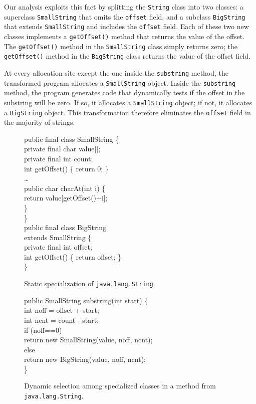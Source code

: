 \documentclass{acmconf}
\begin{document}
Our analysis exploits this fact by splitting the 
{\tt String} class into two classes: a superclass {\tt SmallString}
that omits the {\tt offset} field, and a subclass {\tt BigString} that
extends {\tt SmallString} and includes the {\tt offset} field. 
Each of these two new classes implements a {\tt getOffset()} method
that returns the value of the offset. The {\tt getOffset()} method
in the {\tt SmallString} class simply returns zero; the {\tt
getOffset()} method in the {\tt BigString} class returns the 
value of the offset field. 

At every allocation site except the one inside the {\tt substring}
method, the transformed program allocates a {\tt SmallString} 
object. Inside the {\tt substring} method, the program generates
code that dynamically tests if the offset in the substring
will be zero. If so, it allocates a {\tt SmallString} object;
if not, it allocates a {\tt BigString} object. This transformation
therefore eliminates the {\tt offset} field in the majority
of strings. 

\begin{figure}[tp]
\begin{samplecode}
public final class SmallString \{\\
\>private final char value[];\\
\>private final int count;\\
\>int getOffset() \{ return 0; \}\\
\>\ldots\\
\>public char charAt(int i) \{\\
\>\>return value[getOffset()+i];\\
\>\}\\
\}\\
public final class BigString\\
\>\>extends SmallString \{\\
\>private final int offset;\\
\>int getOffset() \{ return offset; \}\\
\}\\
\end{samplecode}
\caption{Static specialization of {\tt java.lang.String}.}
\label{fig:big-small}
\end{figure}

\begin{figure}[tp]
\begin{samplecode}
public SmallString substring(int start) \{\\
\>int noff = offset + start;\\
\>int ncnt = count - start;\\
\>if (noff==0)\\
\>\>return new SmallString(value, noff, ncnt);\\
\>else\\
\>\>return new BigString(value, noff, ncnt);\\
\}\\
\end{samplecode}
\caption{Dynamic selection among specialized classes in a method
  from {\tt java.lang.String}.}
\label{fig:dyn-select}
\end{figure}
\end{document}

